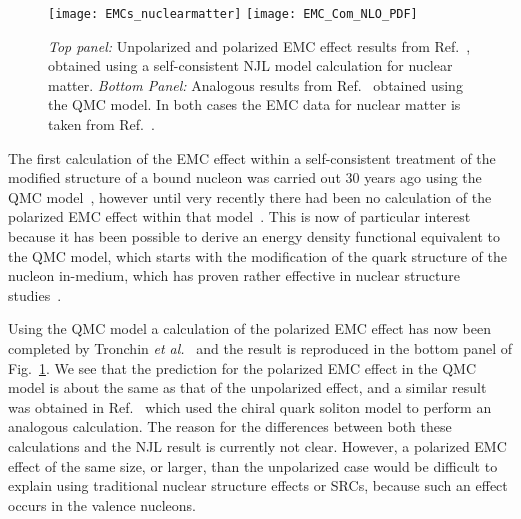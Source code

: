\begin{figure}[tbp]
\centering\texttt{[image: EMCs\_nuclearmatter]}
\centering\texttt{[image: EMC\_Com\_NLO\_PDF]}
\caption{{\it Top panel:} Unpolarized and polarized EMC effect results from Ref.~\cite{Cloet:2005rt}, obtained using a self-consistent NJL model calculation for nuclear matter. {\it Bottom Panel:} Analogous results from Ref.~\cite{Tronchin:2018mvu} obtained using the QMC model. In both cases the EMC data for nuclear matter is taken from Ref.~\cite{Sick:1992pw}.}
\label{fig:EMC_Com}
\end{figure}

The first calculation of the EMC effect within a self-consistent treatment of the modified structure of a bound nucleon was carried out 30 years ago using the QMC model~\cite{Thomas:1989vt}, however until very recently there had been no calculation of the polarized EMC effect within that model~\cite{Guichon:1995ue}. This is now of particular interest because it has been possible to derive an energy density functional equivalent to the QMC model, which starts with the modification of the quark structure of the nucleon in-medium, which has proven rather effective in nuclear structure studies~\cite{Guichon:2018uew,Stone:2017oqt,Stone:2016qmi}. 

Using the QMC model a calculation of the polarized EMC effect has now been completed by Tronchin {\it et al.}~\cite{Tronchin:2018mvu} and the result is reproduced in the bottom panel of Fig.~\ref{fig:EMC_Com}. We see that the prediction for the polarized EMC effect in the QMC model is about the same as that of the unpolarized effect, and a similar result was obtained in Ref.~\cite{Smith:2005ra} which used the chiral quark soliton model to perform an analogous calculation. The reason for the differences between both these calculations and the NJL result is currently not clear. However, a polarized EMC effect of the same size, or larger, than the unpolarized case would be difficult to explain using traditional nuclear structure effects or SRCs, because such an effect occurs in the valence nucleons. 

